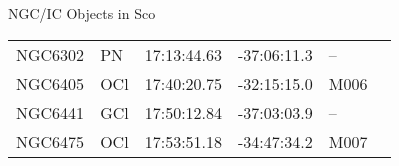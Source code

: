 \begin{block}{NGC/IC Objects in Sco}
  \centering
  \begin{tabularx}{\textwidth}{llrrll} \toprule 
    NGC6302 & PN & 17:13:44.63 & -37:06:11.3  & -- \\ 
    NGC6405 & OCl & 17:40:20.75 & -32:15:15.0  & M006 \\ 
    NGC6441 & GCl & 17:50:12.84 & -37:03:03.9  & -- \\ 
    NGC6475 & OCl & 17:53:51.18 & -34:47:34.2  & M007 \\ 
  \end{tabularx}
\end{block}